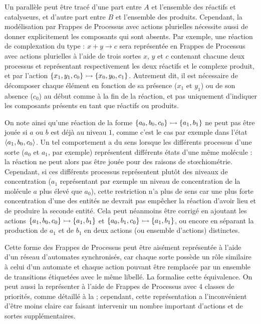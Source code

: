 Un parallèle peut être tracé d'une part entre $A$ et l'ensemble des réactifs et catalyseurs,
et d'autre part entre $B$ et l'ensemble des produits.
Cependant, la modélisation par Frappes de Processus avec actions plurielles
nécessite aussi de donner explicitement les composants qui sont absents.
Par exemple, une réaction de complexation du type : $x + y \rightarrow c$ %
sera représentée en Frappes de Processus avec actions plurielles
à l'aide de trois sortes $x$, $y$ et $c$ contenant chacune deux processus et
représentant respectivement les deux réactifs et le complexe produit,
et par l'action $\mbox{$\{x_1, y_1, c_0\} \rightarrowtail \{x_0, y_0, c_1\}$}$.
Autrement dit, il est nécessaire de décomposer chaque élément en fonction de sa présence
($x_1$ et $y_1$)
ou de son absence ($c_0$) au début comme à la fin de la réaction,
et pas uniquement d'indiquer les composants présents en tant que réactifs ou produits.

On note ainsi qu'une réaction de la forme $\mbox{$\{ a_0, b_0, c_0 \} \rightarrowtail \{ a_1, b_1 \}$}$
ne peut pas être jouée
si $a$ ou $b$ est déjà au niveau $1$,
comme c'est le cas par exemple dans l'état $\mbox{$\langle a_1, b_0, c_0 \rangle$}$.
Un tel comportement a du sens lorsque les différents processus d'une sorte
($a_0$ et $a_1$, par exemple)
représentent différents états d'une même molécule :
la réaction ne peut alors pas être jouée pour des raisons de stœchiométrie.
Cependant, si ces différents processus représentent plutôt des niveaux de concentration
($a_1$ représentant par exemple un niveau de concentration de la molécule $a$ plus élevé que $a_0$),
cette restriction n'a plus de sens car une plus forte concentration d'une des entités
ne devrait pas empêcher la réaction d'avoir lieu et de produire la seconde entité.
Cela peut néanmoins être corrigé en ajoutant les actions
$\mbox{$\{ a_1, b_0, c_0 \} \rightarrowtail \{ a_1, b_1 \}$}$ et
$\mbox{$\{ a_0, b_1, c_0 \} \rightarrowtail \{ a_1, b_1 \}$}$,
ou encore en séparant la production de $a_1$ et de $b_1$ en deux actions (ou ensemble d'actions)
distinctes.

\myskip

Cette forme des Frappes de Processus peut être aisément représentée à l'aide d'un réseau
d'automates synchronisés, car chaque sorte possède un rôle similaire à celui d'un automate
et chaque action pouvant être remplacée par un ensemble de transitions étiquetées
avec le même libellé.
La  formalise cette équivalence.
On peut aussi la représenter à l'aide de Frappes de Processus avec 4 classes de priorités,
comme détaillé à la  ;
cependant, cette représentation a l'inconvénient d'être moins claire car faisant intervenir
un nombre important d'actions et de sortes supplémentaires.




